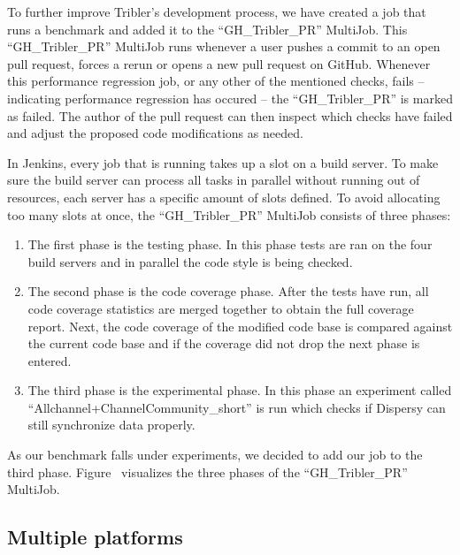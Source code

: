 To further improve Tribler's development process, we have created a job that runs a  benchmark and added it to the \enquote{GH\_Tribler\_PR} MultiJob.
This \enquote{GH\_Tribler\_PR} MultiJob runs whenever a user pushes a commit to an open pull request, forces a rerun or opens a new pull request on GitHub.
Whenever this performance regression job, or any other of the mentioned checks, fails -- indicating performance regression has occured -- the \enquote{GH\_Tribler\_PR} is marked as failed.
The author of the pull request can then inspect which checks have failed and adjust the proposed code modifications as needed.

In Jenkins, every job that is running takes up a slot on a build server.
To make sure the build server can process all tasks in parallel without running out of resources, each server has a specific amount of slots defined.
To avoid allocating too many slots at once, the \enquote{GH\_Tribler\_PR} MultiJob consists of three phases:

\begin{enumerate}
	\item The first phase is the testing phase. In this phase tests are ran on the four build servers and in parallel the code style is being checked.
	\item The second phase is the code coverage phase. After the tests have run, all code coverage statistics are merged together to obtain the full coverage report. Next, the code coverage of the modified code base is compared against the current code base and if the coverage did not drop the next phase is entered.
	\item The third phase is the experimental phase. In this phase an experiment called \enquote{Allchannel+ChannelCommunity\_short} is run which checks if Dispersy can still synchronize data properly.
\end{enumerate}

As our benchmark falls under experiments, we decided to add our job to the third phase.
Figure~  visualizes the three phases of the \enquote{GH\_Tribler\_PR} MultiJob.


\subsection{Multiple platforms}

